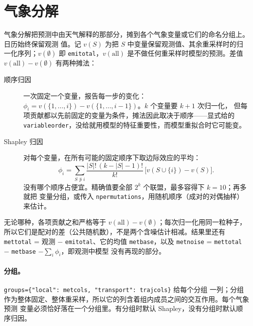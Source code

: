 \documentclass[11pt]{ctexrep}
\newcommand{\codeunderscore}{\textunderscore\allowbreak}
\newcommand{\code}[1]{\texttt{\let\_\codeunderscore #1}}
\begin{document}
\section{气象分解}\label{sec:metdecomp}
气象分解把预测中由天气解释的那部分，摊到各个气象变量或它们的命名分组上。日历始终保留观测
值。记 $v(S)$ 为把 $S$ 中变量保留观测值、其余重采样时的归一化序列；$v(\emptyset)$ 即
\code{emi\_total}，$v(\text{all})$ 是不做任何重采样时模型的预测。差值
$v(\text{all}) - v(\emptyset)$ 有两种摊法：
\begin{description}
  \item[顺序归因] 一次固定一个变量，报告每一步的变化：
        $\phi_i = v(\{1,\dots,i\}) - v(\{1,\dots,i-1\})$。$k$ 个变量要 $k+1$ 次归一化，
        但每项贡献都以先前固定的变量为条件，摊法因此取决于顺序——显式给的
        \code{variable\_order}，没给就用模型的特征重要性，而模型重拟合时它可能变。
  \item[Shapley 归因] 对每个变量，在所有可能的固定顺序下取边际效应的平均：
        \begin{equation}
          \phi_i = \sum_{S \not\ni i} \frac{|S|!\,(k-|S|-1)!}{k!}\,
                   \bigl[v(S\cup\{i\}) - v(S)\bigr].
        \end{equation}
        没有哪个顺序占便宜。精确值要全部 $2^k$ 个联盟，最多容得下 $k=10$；再多就把
        变量分组，或传入 \code{n\_permutations}，用随机顺序（成对的对偶抽样）来估计。
\end{description}
无论哪种，各项贡献之和严格等于 $v(\text{all}) - v(\emptyset)$；每次归一化用同一粒种子，
所以它们是配对的差（公共随机数），不是两个含噪估计相减。结果里还有
\code{met\_total} = 观测 $-$ \code{emi\_total}、它的均值 \code{met\_base}，以及
\code{met\_noise} = \code{met\_total} $-$ \code{met\_base} $-\sum_i\phi_i$，即观测中模型
没有再现的部分。

\paragraph{分组。}\code{groups=\{"local": met\_cols, "transport": traj\_cols\}} 给每个分组
一列；分组作为整体固定、整体重采样，所以它的列含着组内成员之间的交互作用。每个气象预测
变量必须恰好落在一个分组里。有分组时默认 Shapley，没有分组时默认顺序归因。
\end{document}
